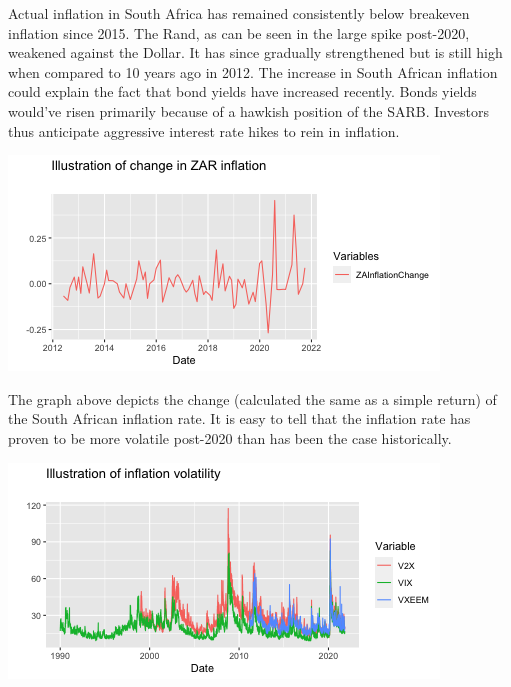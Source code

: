 \documentclass[11pt,preprint, authoryear]{elsarticle}
\let\origfigure\figure
\let\endorigfigure\endfigure
\renewenvironment{figure}[1][2] {
    \expandafter\origfigure\expandafter[H]
} {
    \endorigfigure
}
\numberwithin{equation}{section}
\numberwithin{figure}{section}
\numberwithin{table}{section}
\begin{document}
Actual inflation in South Africa has remained consistently below
breakeven inflation since 2015. The Rand, as can be seen in the large
spike post-2020, weakened against the Dollar. It has since gradually
strengthened but is still high when compared to 10 years ago in 2012.
The increase in South African inflation could explain the fact that bond
yields have increased recently. Bonds yields would've risen primarily
because of a hawkish position of the SARB. Investors thus anticipate
aggressive interest rate hikes to rein in inflation.

\begin{figure}[H]

{\centering \includegraphics{Question2_files/figure-latex/Figure8-1} 

}

\caption{Caption Here \label{Figure8}}\label{fig:Figure8}
\end{figure}

The graph above depicts the change (calculated the same as a simple
return) of the South African inflation rate. It is easy to tell that the
inflation rate has proven to be more volatile post-2020 than has been
the case historically.

\begin{figure}[H]

{\centering \includegraphics{Question2_files/figure-latex/Figure9-1} 

}

\caption{Caption Here \label{Figure9}}\label{fig:Figure9}
\end{figure}
\end{document}
